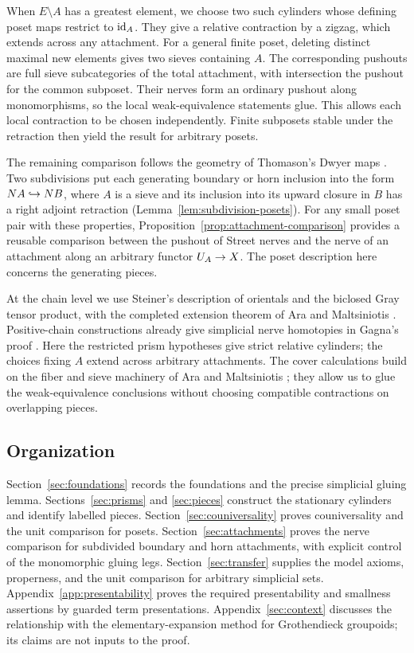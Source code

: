 When $E\setminus A$ has a greatest element, we choose two such
cylinders whose defining poset maps restrict to $\mathrm{id}_A$.
They give a relative contraction by a zigzag, which extends across
any attachment. For a general finite poset, deleting
distinct maximal new elements gives two sieves containing $A$.
The corresponding pushouts are full sieve subcategories of the total
attachment, with intersection the pushout for the common subposet.
Their nerves form an ordinary pushout along
monomorphisms, so the local weak-equivalence statements glue. This
allows each local contraction to be chosen independently. Finite
subposets stable under the retraction then yield the result for
arbitrary posets.

The remaining comparison follows the geometry of Thomason's Dwyer
maps \cite[Propositions~4.2--4.3]{Thomason1980}.
Two subdivisions put each generating boundary or horn inclusion into
the form $N A\hookrightarrow N B$, where $A$ is a sieve and
its inclusion into its upward closure in $B$ has a right adjoint
retraction (Lemma~\ref{lem:subdivision-posets}). For any small poset
pair with these properties, Proposition~\ref{prop:attachment-comparison}
provides a reusable comparison between the pushout of Street nerves
and the nerve of an attachment along an arbitrary functor $U_{A}\to X$.
The poset description here concerns the generating pieces.

At the chain level we use Steiner's description of orientals
\cite{Steiner2004,Steiner2007} and the biclosed Gray tensor product,
with the completed extension theorem of Ara and Maltsiniotis
\cite[Theorem~A.15]{AraMaltsiniotis2020}.
Positive-chain constructions already give simplicial nerve homotopies
in Gagna's proof \cite[Sections~6.3--6.8]{Gagna2018}.
Here the restricted prism hypotheses give strict relative cylinders;
the choices fixing $A$ extend across arbitrary attachments.
The cover calculations build on the
fiber and sieve machinery of Ara and Maltsiniotis
\cite[Lemma~2.8 and Propositions~5.3 and~5.5]{AraMaltsiniotis2014};
they allow us to glue the weak-equivalence conclusions without choosing
compatible contractions on overlapping pieces.

\subsection*{Organization}
Section~\ref{sec:foundations} records the foundations and the precise
simplicial gluing lemma. Sections~\ref{sec:prisms} and
\ref{sec:pieces} construct the stationary cylinders and identify
labelled pieces. Section~\ref{sec:couniversality} proves couniversality
and the unit comparison for posets. Section~\ref{sec:attachments}
proves the nerve comparison for subdivided boundary and horn
attachments, with explicit control of the monomorphic gluing legs.
Section~\ref{sec:transfer} supplies the model axioms, properness, and
the unit comparison for arbitrary simplicial sets.
Appendix~\ref{app:presentability} proves the required presentability
and smallness assertions by guarded term presentations.
Appendix~\ref{sec:context} discusses the relationship with the
elementary-expansion method for Grothendieck groupoids; its claims are not inputs to the
proof.
